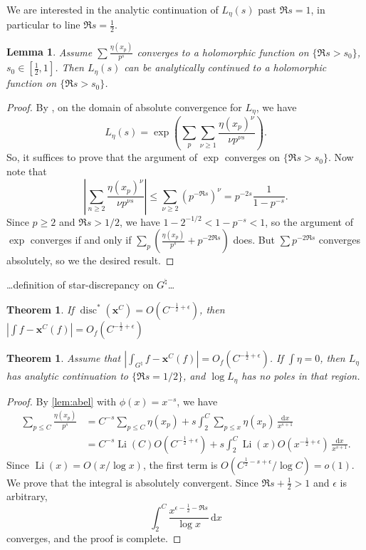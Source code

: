 \documentclass{article}
\DeclareMathOperator{\disc}{disc}
\DeclareMathOperator{\Li}{Li}
\newcommand{\bx}{\boldsymbol{x}}
\newcommand{\dd}{\mathrm{d}}
\newtheorem{theorem}[subsection]{Theorem}
\newtheorem{lemma}[subsection]{Lemma}
\theoremstyle{definition}
\begin{document}
We are interested in the analytic continuation of $L_\eta(s)$ past $\Re s=1$, 
in particular to line $\Re s=\frac 1 2$. 

\begin{lemma}
Assume $\sum \frac{\eta(x_p)}{p^s}$ converges to a holomorphic function on  
$\{\Re s>s_0\}$, $s_0\in \left[\frac 1 2, 1\right]$. Then $L_\eta(s)$ can be 
analytically continued to a holomorphic function on $\{\Re s > s_0\}$. 
\end{lemma}
\begin{proof}
By \cite[11.9, Ex.~2]{apostol-1976}, on the domain of absolute convergence for 
$L_\eta$, we have 
\[
	L_\eta(s) = \exp\left(\sum_p \sum_{\nu\geqslant 1} \frac{\eta(x_p)^\nu}{\nu p^{\nu s}}\right) .
\]
So, it suffices to prove that the argument of $\exp$ converges on 
$\{\Re s>s_0\}$. Now note that 
\[
	\left|\sum_{n\geqslant 2} \frac{\eta(x_p)^\nu}{\nu p^{\nu s}}\right|
		\leqslant \sum_{\nu\geqslant 2} (p^{-\Re s})^\nu 
		= p^{-2 s} \frac{1}{1-p^{-s}} .
\]
Since $p\geqslant 2$ and $\Re s>1/2$, we have $1-2^{-1/2}<1-p^{-s}<1$, so the 
argument of $\exp$ converges if and only if 
$\sum_p \left(\frac{\eta(x_p)}{p^s} + p^{-2\Re s}\right)$ does. But 
$\sum p^{-2\Re s}$ converges absolutely, so we the desired result. 
\end{proof}

\ldots definition of star-discrepancy on $G^\natural$\ldots

\begin{theorem}
If $\disc^\ast(\bx^C) = O(C^{-\frac 1 2+\epsilon})$, then 
$\left|\int f - \bx^C(f)\right| = O_f(C^{-\frac 1 2+\epsilon})$
\end{theorem}

\begin{theorem}
Assume that $\left|\int_{G^\natural} f - \bx^C(f)\right| = O_f(C^{-\frac 1 2+\epsilon})$. 
If $\int \eta = 0$, then $L_\eta$ has analytic continuation to $\{\Re s=1/2\}$, and 
$\log L_\eta$ has no poles in that region. 

\end{theorem}
\begin{proof}
By \autoref{lem:abel} with $\phi(x)=x^{-s}$, we have 
\begin{align*}
	\sum_{p\leqslant C} \frac{\eta(x_p)}{p^s} 
		&= C^{-s} \sum_{p\leqslant C} \eta(x_p) + s \int_2^C \sum_{p\leqslant x} \eta(x_p)\, \frac{\dd x}{x^{s+1}} \\
		&= C^{-s}\Li(C) O(C^{-\frac 1 2+\epsilon}) + s \int_2^C \Li(x) O(x^{-\frac 1 2+\epsilon})\, \frac{\dd x}{x^{s+1}} .
\end{align*}
Since $\Li(x)=O(x/\log x)$, the first term is 
$O(C^{\frac 1 2 -s+\epsilon}/\log C) = o(1)$. We prove that the integral is 
absolutely convergent. Since $\Re s+\frac 1 2>1$ and $\epsilon$ is arbitrary, 
\[
	\int_2^C \frac{x^{\epsilon-\frac 1 2-\Re s}}{\log x}\, \dd x
\]
converges, and the proof is complete. 
\end{proof}
\end{document}
